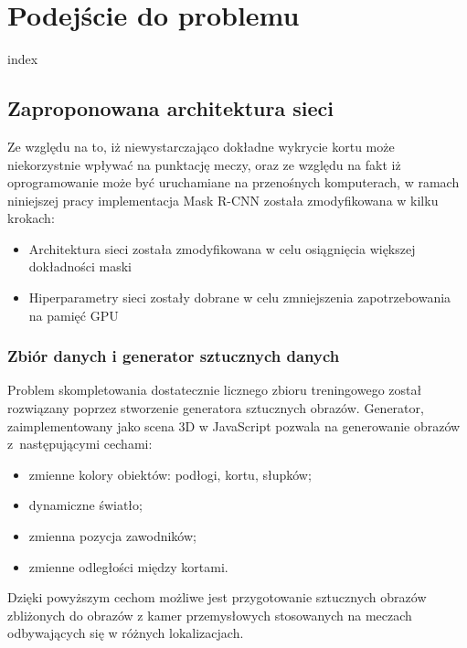 \chapter{Podejście do problemu}

{index}

\section{Zaproponowana architektura sieci}
\label{sec:zaproponowana_architektura}

Ze względu na to, iż niewystarczająco dokładne wykrycie kortu może niekorzystnie wpływać na punktację meczy, oraz ze względu na fakt iż oprogramowanie może być uruchamiane na przenośnych komputerach, w ramach niniejszej pracy implementacja Mask R-CNN została zmodyfikowana w kilku krokach:

\begin{itemize}
	\item Architektura sieci została zmodyfikowana w celu osiągnięcia większej dokładności maski
	\item Hiperparametry sieci zostały dobrane w celu zmniejszenia zapotrzebowania na pamięć GPU
\end{itemize}


\subsection{Zbiór danych i generator sztucznych danych}
\label{sec:generator}

Problem skompletowania dostatecznie licznego zbioru treningowego został rozwiązany poprzez stworzenie generatora sztucznych obrazów.
Generator, zaimplementowany jako scena 3D w JavaScript pozwala na generowanie obrazów z~następującymi cechami:

\begin{itemize}
	\item zmienne kolory obiektów: podłogi, kortu, słupków;
	\item dynamiczne światło;
	\item zmienna pozycja zawodników;
	\item zmienne odległości między kortami.
\end{itemize}

Dzięki powyższym cechom możliwe jest przygotowanie sztucznych obrazów zbliżonych do obrazów z kamer przemysłowych stosowanych na meczach odbywających się w różnych lokalizacjach.

